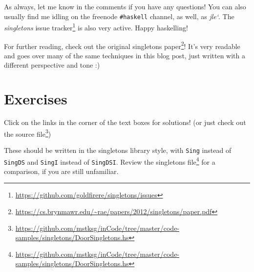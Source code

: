 \documentclass[]{article}
\renewcommand{\href}[2]{#2\footnote{\url{#1}}}
\begin{document}
As always, let me know in the comments if you have any questions! You can also
usually find me idling on the freenode \texttt{\#haskell} channel, as well, as
\emph{jle`}. The \emph{singletons}
\href{https://github.com/goldfirere/singletons/issues}{issue tracker} is also
very active. Happy haskelling!

For further reading, check out the
\href{https://cs.brynmawr.edu/~rae/papers/2012/singletons/paper.pdf}{original
singletons paper}! It's very readable and goes over many of the same techniques
in this blog post, just written with a different perspective and tone :)

\hypertarget{exercises}{%
\section{Exercises}\label{exercises}}

Click on the links in the corner of the text boxes for solutions! (or just check
out
\href{https://github.com/mstksg/inCode/tree/master/code-samples/singletons/DoorSingletons.hs}{the
source file})

These should be written in the singletons library style, with \texttt{Sing}
instead of \texttt{SingDS} and \texttt{SingI} instead of \texttt{SingDSI}.
Review the
\href{https://github.com/mstksg/inCode/tree/master/code-samples/singletons/DoorSingletons.hs}{singletons
file} for a comparison, if you are still unfamiliar.
\end{document}
